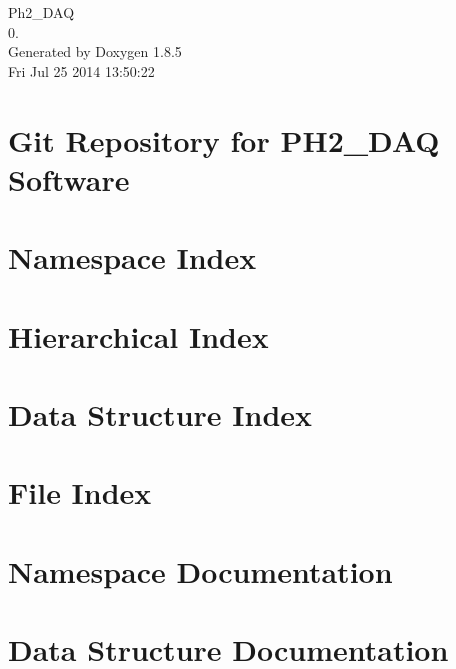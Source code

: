 \documentclass[twoside]{book}
\newcommand{\clearemptydoublepage}{%
  \newpage{\pagestyle{empty}\cleardoublepage}%
}
\begin{document}
\hypersetup{pageanchor=false}
\begin{titlepage}
\vspace*{7cm}
\begin{center}%
{\Large Ph2\-\_\-\-D\-A\-Q \\[1ex]\large 0. }\\
\vspace*{1cm}
{\large Generated by Doxygen 1.8.5}\\
\vspace*{0.5cm}
{\small Fri Jul 25 2014 13:50:22}\\
\end{center}
\end{titlepage}
\clearemptydoublepage
\tableofcontents
\clearemptydoublepage
{}
\hypersetup{pageanchor=true}

\chapter{Git Repository for P\-H2\-\_\-\-D\-A\-Q Software}
\label{md__r_e_a_d_m_e}
\hypertarget{md__r_e_a_d_m_e}{}

\chapter{Namespace Index}

\chapter{Hierarchical Index}

\chapter{Data Structure Index}

\chapter{File Index}

\chapter{Namespace Documentation}


\chapter{Data Structure Documentation}














\end{document}
